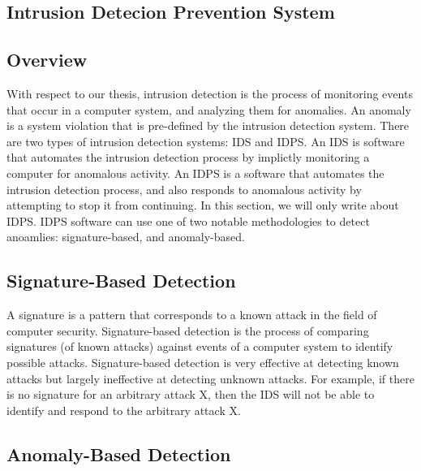 \documentclass{report}
\begin{document}
\begin{spacing}{1.5}
\section{Intrusion Detecion Prevention System}

\subsection{Overview}

{\large
With respect to our thesis, intrusion detection is the process of monitoring events that occur in a computer system, and analyzing them for anomalies. An anomaly is a system violation that is pre-defined by the intrusion detection system. There are two types of intrusion detection systems: IDS and IDPS. An IDS is software that automates the intrusion detection process by implictly monitoring a computer for anomalous activity. An IDPS is a software that automates the intrusion detection process, and also responds to anomalous activity by attempting to stop it from continuing. In this section, we will only write about IDPS. IDPS software can use one of two notable methodologies to detect anoamlies: signature-based, and anomaly-based.
\newline
}


\subsection{Signature-Based Detection}

{\large
A signature is a pattern that corresponds to a known attack in the field of computer security. Signature-based detection is the process of comparing signatures (of known attacks) against events of a computer system to identify possible attacks. Signature-based detection is very effective at detecting known attacks but largely ineffective at detecting unknown attacks. For example, if there is no signature for an arbitrary attack X, then the IDS will not be able to identify and respond to the arbitrary attack X.
\newline
}


\subsection{Anomaly-Based Detection}


\end{spacing}
\end{document}
